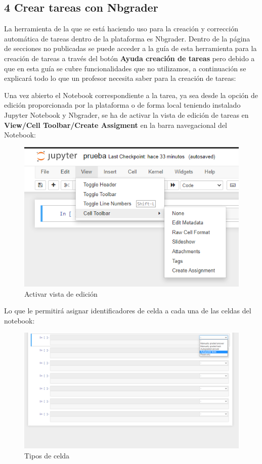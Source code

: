 \subsection{4 Crear tareas con Nbgrader}
La herramienta de la que se está haciendo uso para la creación y corrección automática de tareas dentro de la plataforma es Nbgrader. Dentro de la página de secciones no publicadas se puede acceder a la guía de esta herramienta para la creación de tareas a través del botón \textbf{Ayuda creación de tareas} pero debido a que en esta guía se cubre funcionalidades que no utilizamos, a continuación se explicará todo lo que un profesor necesita saber para la creación de tareas:

Una vez abierto el Notebook correspondiente a la tarea, ya sea desde la opción de edición proporcionada por la plataforma o de forma local teniendo instalado Jupyter Notebook y Nbgrader, se ha de activar la vista de edición de tareas en \textbf{View/Cell Toolbar/Create Assigment} en la barra navegacional del Notebook:

\begin{figure}[H]
\centering
\includegraphics[width=\textwidth]{img/imgs-memoria/ActivarEdit.PNG}
\caption{Activar vista de edición}
\end{figure}

Lo que le permitirá asignar identificadores de celda a cada una de las celdas del notebook:

\begin{figure}[H]
\centering
\includegraphics[width=\textwidth]{img/imgs-memoria/TipoCelda.PNG}
\caption{Tipos de celda}
\end{figure}

